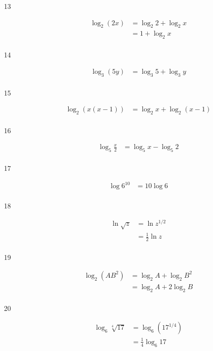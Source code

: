 \documentclass{exam}
\begin{document}
\begin{description}
      \item[13] 
        \begin{align*}
          \log_2 \left( 2x \right) &= \log_2 2 + \log_2 x \\
                                   &= \boxed{1 + \log_2 x} \\
        \end{align*}

      \item[14] 
        \begin{align*}
          \log_3 \left( 5y \right) &= \boxed{\log_3 5 + \log_3 y} \\
        \end{align*}

      \item[15] 
        \begin{align*}
          \log_2 (x (x - 1)) &= \boxed{\log_2 x + \log_2 (x - 1)} \\
        \end{align*}

      \item[16] 
        \begin{align*}
          \log_5 \frac{x}{2} &= \boxed{\log_5 x - \log_5 2} \\
        \end{align*}

      \item[17] 
        \begin{align*}
          \log 6^{10} &= \boxed{10 \log 6} \\
        \end{align*}

      \item[18] 
        \begin{align*}
          \ln \sqrt{z} &= \ln z^{1/2} \\
                       &= \boxed{\frac{1}{2} \ln z} \\
        \end{align*}

      \item[19] 
        \begin{align*}
          \log_2 \left( AB^2 \right) &= \log_2 A + \log_2 B^2 \\
                                     &= \boxed{\log_2 A + 2 \log_2 B} \\
        \end{align*}
      \item[20] 
        \begin{align*}
          \log_6 \sqrt[4]{17} &= \log_6 \left( 17^{1/4} \right) \\
                              &= \boxed{\frac{1}{4} \log_6 17} \\
        \end{align*}


\end{description}
\end{document}
